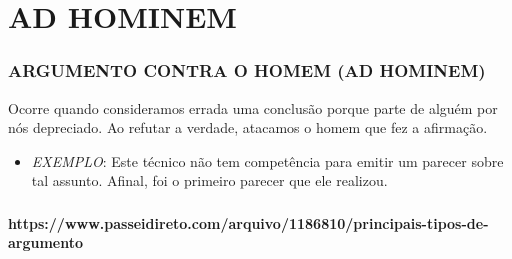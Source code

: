 \documentclass[aspectratio=1610]{beamer}
\begin{document}
\section {AD HOMINEM}
\begin{frame}
  \frametitle{ARGUMENTO CONTRA O HOMEM (AD HOMINEM)   }
\begin{center}
Ocorre quando consideramos errada uma conclusão porque parte de alguém por nós depreciado. Ao refutar a verdade, atacamos o homem que fez a afirmação.
\end{center}

\begin{itemize}
  \item \textit{EXEMPLO}: Este técnico não tem competência para emitir um parecer sobre tal assunto. Afinal, foi o primeiro parecer que ele realizou.
\end{itemize}
\end{frame}

\begin{frame}
  \frametitle{}
\begin{center}
\textbf{https://www.passeidireto.com/arquivo/1186810/principais-tipos-de-argumento}
\end{center}
\end{frame}
\end{document}
